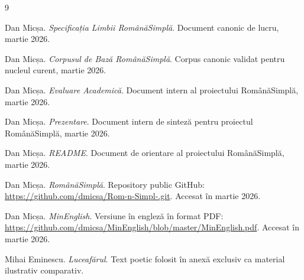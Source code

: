 \documentclass[12pt,onecolumn,letterpaper]{article}
\begin{document}
\begin{thebibliography}{9}

Dan Micșa.
\textit{Specificația Limbii RomânăSimplă}.
Document canonic de lucru, martie 2026.

Dan Micșa.
\textit{Corpusul de Bază RomânăSimplă}.
Corpus canonic validat pentru nucleul curent, martie 2026.

Dan Micșa.
\textit{Evaluare Academică}.
Document intern al proiectului RomânăSimplă, martie 2026.

Dan Micșa.
\textit{Prezentare}.
Document intern de sinteză pentru proiectul RomânăSimplă, martie 2026.

Dan Micșa.
\textit{README}.
Document de orientare al proiectului RomânăSimplă, martie 2026.

Dan Micșa.
\textit{RomânăSimplă}.
Repository public GitHub: \url{https://github.com/dmicsa/Rom-n-Simpl-.git}.
Accesat în martie 2026.

Dan Micșa.
\textit{MinEnglish}.
Versiune în engleză în format PDF: \url{https://github.com/dmicsa/MinEnglish/blob/master/MinEnglish.pdf}.
Accesat în martie 2026.

Mihai Eminescu.
\textit{Luceafărul}.
Text poetic folosit în anexă exclusiv ca material ilustrativ comparativ.

\end{thebibliography}
\end{document}
